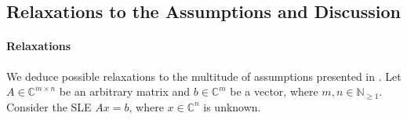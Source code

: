 \subsection{Relaxations to the Assumptions and Discussion } \label{hhl_discussion}

\paragraph*{Relaxations} We deduce possible relaxations to the multitude of assumptions presented in . Let \(A \in \mathbb{C}^{m \times n}\) be an arbitrary matrix and \(b \in \mathbb{C}^m\) be a vector, where \(m, n \in \mathbb{N}_{\geq 1}\). Consider the SLE \(Ax=b\), where \(x \in \mathbb{C}^n\) is unknown.

